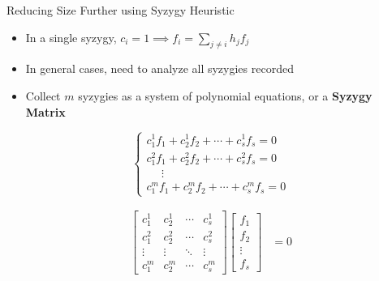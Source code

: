 \documentclass[xcolor=dvipsnames]{beamer}
\newcommand{\bi}{\begin{itemize}}
\newcommand{\ei}{\end{itemize}}
\begin{document}
\begin{frame}{\large{Reducing Size Further using Syzygy Heuristic}}
\bi
\item In a single syzygy, $c_i=1 \implies f_i = \sum_{j\neq i} h_jf_j$
\item In general cases, need to analyze all syzygies recorded
\item Collect $m$ syzygies as a system of polynomial equations, or a {\bf Syzygy Matrix}
\ei
\hspace{-0.1in}
\begin{minipage}{2.5in}
\begin{equation*} \label{eqn:syz}
 \begin{cases}
 c_1^1f_1+c_2^1f_2+\cdots+c_s^1f_s = 0\\
 c_1^2f_1+c_2^2f_2+\cdots+c_s^2f_s  = 0\\
 \ \ \ \ \ \  \vdots \\
 c_1^mf_1+c_2^mf_2+\cdots+c_s^mf_s = 0  
 \end{cases}
\end{equation*}
\end{minipage}
\hspace{-0.3in}
\begin{minipage}{2in}
\begin{center}
\begin{align*}
\label{mat:syzygy}
   \begin{bmatrix}
           c_1^1 & c_2^1 & \cdots & c_s^1 \\
           c_1^2 & c_2^2 & \cdots & c_s^2 \\
           \vdots & \vdots & \ddots & \vdots \\
           c_1^m & c_2^m & \cdots & c_s^m
         \end{bmatrix}
    \begin{bmatrix}
           f_{1} \\
           f_{2} \\
           \vdots \\
           f_{s}
         \end{bmatrix}
         &= 0
  \end{align*}

\end{center}
\end{minipage}
\end{frame}
\end{document}
